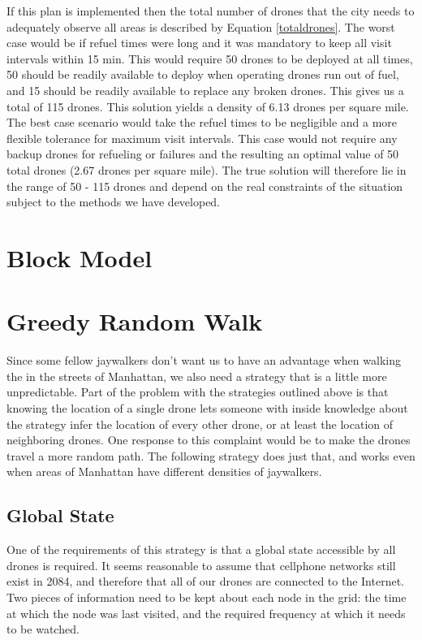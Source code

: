 \documentclass{article}
\begin{document}
\indent If this plan is implemented then the total number of drones that the city needs to adequately observe all areas is described by Equation \ref{totaldrones}. The worst case would be if refuel times were long and it was mandatory to keep all visit intervals within 15 min. This would require 50 drones to be deployed at all times, 50 should be readily available to deploy when operating drones run out of fuel, and 15 should be readily available to replace any broken drones. This gives us a total of 115 drones. This solution yields a density of 6.13 drones per square mile. The best case scenario would take the refuel times to be negligible and a more flexible tolerance for maximum visit intervals. This case would not require any backup drones for refueling or failures and the resulting an optimal value of 50 total drones (2.67 drones per square mile). The true solution will therefore lie in the range of 50 - 115 drones and depend on the real constraints of the situation subject to the methods we have developed.

\section{Block Model}
\label{sec:block_model}

\section{Greedy Random Walk}
\label{sec:greedy_random_walk_model}
Since some fellow jaywalkers don't want us to have an advantage when walking the in the streets of Manhattan, we also need a strategy that is a little more unpredictable. Part of the problem with the strategies outlined above is that knowing the location of a single drone lets someone with inside knowledge about the strategy infer the location of every other drone, or at least the location of neighboring drones. One response to this complaint would be to make the drones travel a more random path. The following strategy does just that, and works even when areas of Manhattan have different densities of jaywalkers.

\subsection{Global State}
\label{sub:global_state}
One of the requirements of this strategy is that a global state accessible by all drones is required. It seems reasonable to assume that cellphone networks still exist in 2084, and therefore that all of our drones are connected to the Internet. Two pieces of information need to be kept about each node in the grid: the time at which the node was last visited, and the required frequency at which it needs to be watched.
\end{document}
